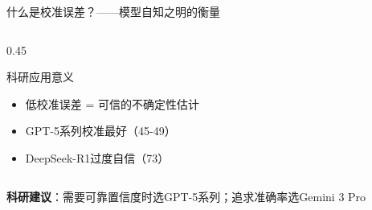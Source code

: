 \documentclass[aspectratio=169,11pt]{beamer}
\begin{document}
\begin{frame}{什么是校准误差？——模型自知之明的衡量}
\begin{columns}
\begin{column}{0.45\textwidth}
            \vspace{0.2cm}
            \begin{block}{\small 科研应用意义}
                \footnotesize
                \begin{itemize}
                    \item 低校准误差 = 可信的不确定性估计
                    \item GPT-5系列校准最好（45-49）
                    \item DeepSeek-R1过度自信（73）
                \end{itemize}
            \end{block}
        \end{column}
    \end{columns}
    
    \vspace{0.2cm}
    {\footnotesize \textbf{科研建议}：需要可靠置信度时选GPT-5系列；追求准确率选Gemini 3 Pro}
\end{frame}
\end{document}
